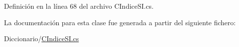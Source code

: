 Definición en la línea 68 del archivo C\-Indice\-S\-I.\-cs.



La documentación para esta clase fue generada a partir del siguiente fichero\-:\begin{DoxyCompactItemize}
\item 
Diccionario/\hyperlink{_c_indice_s_i_8cs}{C\-Indice\-S\-I.\-cs}\end{DoxyCompactItemize}
